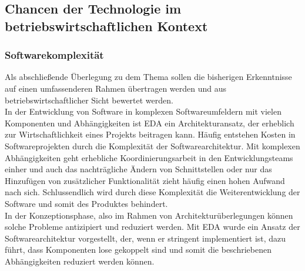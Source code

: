 \subsection{Chancen der Technologie im betriebswirtschaftlichen Kontext}
\subsubsection*{Softwarekomplexität}
Als abschließende Überlegung zu dem Thema sollen die bisherigen Erkenntnisse auf einen umfassenderen Rahmen übertragen werden und aus betriebswirtschaftlicher Sicht bewertet werden. \\
In der Entwicklung von Software in komplexen Softwareumfeldern mit vielen Komponenten und Abhängigkeiten ist \ac{EDA} ein Architekturansatz, der erheblich zur Wirtschaftlichkeit eines Projekts beitragen kann. Häufig entstehen Kosten in Softwareprojekten durch die Komplexität der Softwarearchitektur. Mit komplexen Abhängigkeiten geht erhebliche Koordinierungsarbeit in den Entwicklungsteams einher und auch das nachträgliche Ändern von Schnittstellen oder nur das Hinzufügen von zusätzlicher Funktionalität zieht häufig einen hohen Aufwand nach sich. Schlussendlich wird durch diese Komplexität die Weiterentwicklung der Software und somit des Produktes behindert. \\
In der Konzeptionsphase, also im Rahmen von Architekturüberlegungen können solche Probleme antizipiert und reduziert werden. Mit \ac{EDA} wurde ein Ansatz der Softwarearchitektur vorgestellt, der, wenn er stringent implementiert ist, dazu führt, dass Komponenten lose gekoppelt sind und somit die beschriebenen Abhängigkeiten reduziert werden können. \\
